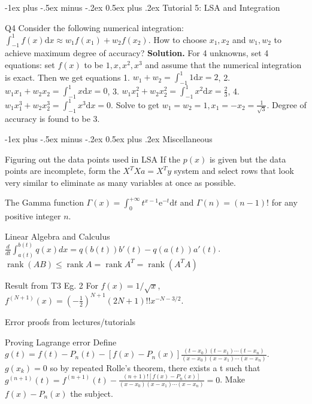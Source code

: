 \documentclass[10pt,landscape]{article}
\makeatletter
\renewcommand{\section}{\@startsection{section}{1}{0mm}%
                                {-1ex plus -.5ex minus -.2ex}%
                                {0.5ex plus .2ex}%
                                {\normalfont\large\bfseries}}
\theoremstyle{definition}
\newcommand{\thistheoremname}{}
\newtheorem*{genericthm*}{\thistheoremname}
\newenvironment{namedthm*}[1]
{\renewcommand{\thistheoremname}{#1}\begin{genericthm*}}
{\end{genericthm*}}
\makeatother
\begin{document}
\begin{multicols}{3}
	\section{Tutorial 5: LSA and Integration}
	\begin{namedthm*}{Q4}
		Consider the following numerical integration: \(\int_{-1}^{1} f(x) \mathrm{d} x \approx w_{1} f\left(x_{1}\right)+w_{2} f\left(x_{2}\right)\).
		How to choose \(x_{1}, x_{2}\) and \(w_{1}, w_{2}\) to achieve maximum degree of accuracy? \textbf{Solution.} For 4 unknowns, set 4 equations: set \(f(x)\) to be \(1, x, x^{2}, x^{3}\) and assume that the numerical integration is exact. Then we get
		equations 1.
		\(
		w_{1}+w_{2}=\int_{-1}^{1} 1 \mathrm{d} x=2
		\), 2.
		\(w_{1} x_{1}+w_{2} x_{2}=\int_{-1}^{1} x \mathrm{d} x=0\), 3.
		\(w_{1} x_{1}^{2}+w_{2} x_{2}^{2}=\int_{-1}^{1} x^{2} \mathrm{d} x=\frac{2}{3}\), 4.
		\(w_{1} x_{1}^{3}+w_{2} x_{2}^{3}=\int_{-1}^{1} x^{3} \mathrm{d} x=0\). Solve to get \(w_1 = w_2 = 1, x_1 = -x_2 = \frac{1}{\sqrt{3}}\). Degree of accuracy is found to be 3.

	\end{namedthm*}

	\section{Miscellaneous}
	\begin{namedthm*}{Figuring out the data points used in LSA} If the \(p(x)\) is given but the data points are incomplete, form the \(X^TXa=X^Ty\) system and select rows that look very similar to eliminate as many variables at once as possible.
	\end{namedthm*}
	\begin{namedthm*}{The Gamma function} \(\Gamma(x)=\int_{0}^{+\infty} t^{x-1} \mathrm{e}^{-t} \mathrm{d} t\) and \(\Gamma(n)=(n-1) !\) for any positive integer \(n\).
	\end{namedthm*}
	\begin{namedthm*}{Linear Algebra and Calculus}
		\(\frac{d}{dt}\int_{a(t)}^{b(t)}q(x)dx= q(b(t))b'(t)-q(a(t))a'(t)\).
		\(\operatorname{rank}(A B) \leqslant \operatorname{rank} A=\operatorname{rank} A^{T}=\operatorname{rank}\left(A^{T} A\right)\)
	\end{namedthm*}
	\begin{namedthm*}{Result from T3 Eg. 2}
		For \(f(x)=1 / \sqrt{x}\),
		\(
		f^{(N+1)}(x)=\left(-\frac{1}{2}\right)^{N+1}(2 N+1) !! x^{-N-3 / 2}
		\).
	\end{namedthm*}
	\begin{namedthm*}{Error proofs from lectures/tutorials}
		\begin{namedthm*}{Proving Lagrange error} Define \(g(t)=f(t)-P_{n}(t)-\left[f(x)-P_{n}(x)\right] \frac{\left(t-x_{0}\right)\left(t-x_{1}\right) \cdots\left(t-x_{n}\right)}{\left(x-x_{0}\right)\left(x-x_{1}\right) \cdots\left(x-x_{n}\right)}\). \(g(x_k)=0\) so by repeated Rolle's theorem, there exists a t such that \(g^{(n+1)}(t)=f^{(n+1)}(t)-\frac{(n+1) !\left[f(x)-P_{n}(x)\right]}{\left(x-x_{0}\right)\left(x-x_{1}\right) \cdots\left(x-x_{n}\right)}= 0\). Make \(f(x)-P_n(x)\) the subject.


\end{namedthm*}
\end{namedthm*}
\end{multicols}
\end{document}
